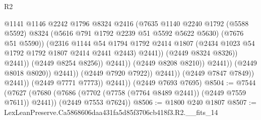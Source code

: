 \begin{lexlean}{R2}
\begin{coremodule}
                                                @1141
                                                @1146
                                                @2242
                                                @1796
                                                @8324
                                                @2416
                                                (@7635
                                                  @1140
                                                  @2240
                                                  @1792
                                                  (@5588 @5592)
                                                  @8324
                                                  (@5616 @791 @1792 @2239 @51 @5592 @5622 @5630)
                                                  (@7676 @51 @5590))
                                                (@2316
                                                  @1144
                                                  @54
                                                  @1794
                                                  @1792
                                                  @2414
                                                  @1807
                                                  (@2434
                                                    @1023
                                                    @54
                                                    @1792
                                                    @1792
                                                    @1807
                                                    @2414
                                                    @2441
                                                    @2443)
                                                  @2441))
                                              (@2449 @8324 @8326))
                                            @2441))
                                        (@2449 @8254 @8256))
                                      @2441))
                                  (@2449 @8208 @8210))
                                @2441))
                            (@2449 @8018 @8020))
                          @2441))
                      (@2449 @7920 @7922))
                    @2441))
                (@2449 @7847 @7849))
              @2441))
          (@2449 @7771 @7773))
        @2441))
    (@2449 @7693 @7695)
@8504 := @7544
    (@7627
      (@7680 (@7686 (@7702 (@7758 (@7764 @8489 @2441)) (@2449 @7559 @7611)) @2441))
      (@2449 @7553 @7624))
@8506 := @1800 @240 @1807
@8507 := LexLeanPreserve.Ca5868606daa431fa5d85f3706cb418f3.R2.__fits_14

\end{coremodule}
\end{lexlean}
